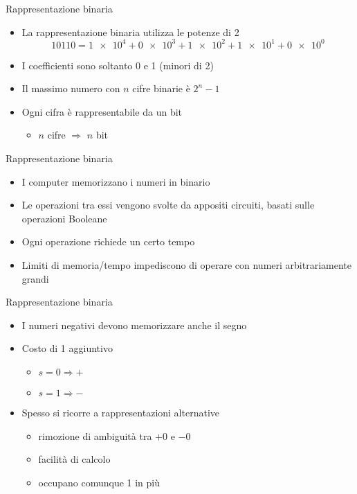 \begin{frame}{Rappresentazione binaria}
  \vfill
  \begin{itemize}
    \item La rappresentazione \alert{binaria} utilizza le potenze di 2
    \[\num[group-digits = false]{10110} = \num[exponent-base = 2]{1e4} + \num[exponent-base = 2]{0e3}
    + \num[exponent-base = 2]{1e2} + \num[exponent-base = 2]{1e1} + \num[exponent-base = 2]{0e0}\]
    \item I coefficienti sono soltanto 0 e 1 (\alert{minori} di 2)
    \vfill
    \item Il massimo numero con \(n\) cifre binarie è \(2^n - 1\)
    \vfill
    \item Ogni cifra è rappresentabile da un \alert{bit}
    \begin{itemize}
      \item \(n\) cifre \(\Rightarrow\) \(n\) bit
    \end{itemize}
  \end{itemize}
  \vfill
\end{frame}

\begin{frame}{Rappresentazione binaria}
  \vfill
  \begin{itemize}
    \item I computer memorizzano i numeri in binario
    \vfill
    \item Le operazioni tra essi vengono svolte da appositi circuiti, basati
    sulle operazioni Booleane
    \vfill
    \item Ogni operazione richiede un certo tempo
    \vfill
    \item Limiti di memoria/tempo impediscono di operare con numeri arbitrariamente
    grandi
  \end{itemize}
  \vfill
\end{frame}

\begin{frame}{Rappresentazione binaria}
  \vfill
  \begin{itemize}
    \item I numeri negativi devono memorizzare anche il segno
    \vfill
    \item Costo di \SI{1}{\bit} aggiuntivo
    \begin{itemize}
      \item \(s = 0 \Rightarrow +\)
      \item \(s = 1 \Rightarrow -\)
    \end{itemize}
    \vfill
    \item Spesso si ricorre a rappresentazioni alternative
    \begin{itemize}
      \item rimozione di ambiguità tra \(+0\) e \(-0\)
      \item facilità di calcolo
      \item occupano comunque \SI{1}{\bit} in più
    \end{itemize}
  \end{itemize}
  \vfill
\end{frame}

